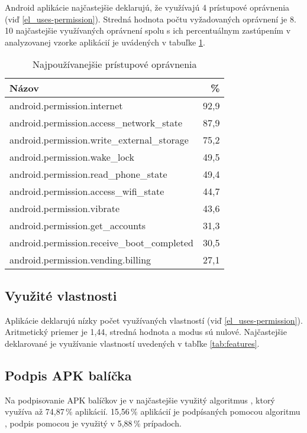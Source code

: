Android aplikácie najčastejšie deklarujú, že využívajú 4 prístupové oprávnenia (viď \ref{el_uses-permission}). Stredná hodnota počtu vyžadovaných oprávnení je 8. 10 najčastejšie využívaných oprávnení spolu s ich percentuálnym zastúpením v analyzovanej vzorke aplikácií je uvádených v tabuľke \ref{tab:permissions}. 
\begin{table}[!htbp]
\centering
  \begin{tabular}{|l r|}
    \hline
    Názov & \% \\\hline\hline
    android.permission.internet & 92,9 \\
    android.permission.access\_network\_state & 87,9 \\
    android.permission.write\_external\_storage & 75,2 \\
    android.permission.wake\_lock & 49,5 \\
    android.permission.read\_phone\_state & 49,4 \\
    android.permission.access\_wifi\_state & 44,7 \\
    android.permission.vibrate & 43,6 \\
    android.permission.get\_accounts & 31,3 \\
    android.permission.receive\_boot\_completed & 30,5 \\
    android.permission.vending.billing & 27,1 \\
    \hline
  \end{tabular}
  \caption{Najpoužívanejšie prístupové oprávnenia}
  \label{tab:permissions}
\end{table}

\subsection*{Využité vlastnosti}
Aplikácie deklarujú nízky počet využívaných vlastností (viď \ref{el_uses-permission}). Aritmetický priemer je 1,44, stredná hodnota a modus sú nulové. Najčastejšie deklarované je využívanie vlastností uvedených v tabľke \ref{tab:features}.

\subsection{Podpis APK balíčka}
Na podpisovanie APK balíčkov je v najčastejšie využitý algoritmus , ktorý využíva až 74,87\,\% aplikácií. 15,56\,\% aplikácií je podpísaných pomocou algoritmu , podpis pomocou  je využitý v 5,88\,\% prípadoch.


